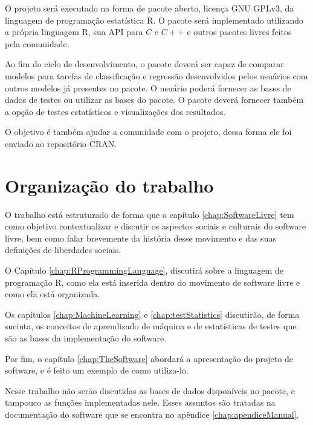O projeto será executado na forma de pacote aberto, licença GNU GPLv3, da linguagem de programação estatística R. O pacote será implementado utilizando a própria linguagem R, sua API para $C$ e $C++$ e outros pacotes livres feitos pela comunidade.

Ao fim do ciclo de desenvolvimento, o pacote deverá ser capaz de comparar modelos para tarefas de classificação e regressão desenvolvidos pelos usuários com outros modelos já presentes no pacote.  O usuário poderá fornecer as bases de dados de testes ou utilizar as bases do pacote. O pacote deverá fornecer também a opção de testes estatísticos e visualizações dos resultados.

O objetivo é também ajudar a comunidade com o projeto, dessa forma ele foi enviado ao repositório CRAN.


\section{Organização do trabalho}
\label{sec:organizacaoTrabalho}

O trabalho está estruturado de forma que o capítulo \ref{chap:SoftwareLivre} tem como objetivo contextualizar e discutir os aspectos sociais e culturais do software livre, bem como falar brevemente da história desse movimento e das suas definições de liberdades sociais.

O Capítulo \ref{chap:RProgrammingLanguage}, discutirá sobre a linguagem de programação R, como ela está inserida dentro do movimento de software livre e como ela está organizada. 

Os capítulos \ref{chap:MachineLearning} e \ref{chap:testStatistics} discutirão, de forma sucinta, os conceitos de aprendizado de máquina e de estatísticas de testes que são as bases da implementação do software. 

Por fim, o capítulo \ref{chap:TheSoftware} abordará a apresentação do projeto de software, e é feito um exemplo de como utiliza-lo.

Nesse trabalho não serão discutidas as bases de dados disponíveis no pacote, e tampouco as funções implementadas nele. Esses assuntos são tratadas na documentação do software que se encontra no apêndice \ref{chap:apendiceManual}.
